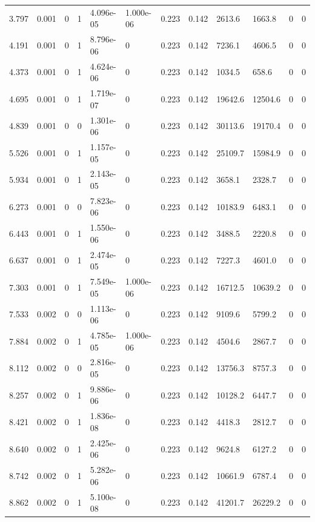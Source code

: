 \documentclass[preview]{standalone}
\begin{document}
{{\begin{tabular}{L{1.2cm}C{1.2cm} C{0.3cm}C{0.5cm} C{1.4cm}C{1.4cm} C{1.4cm}C{1.4cm} C{1.6cm}C{1.6cm} C{1.6cm}C{1.6cm}}
  3.797  &  0.001  & 0     &  1 &  4.096e-05  & 1.000e-06  &  0.223&   0.142& 2613.6 & 1663.8   &  0 & 0  \\ 
  4.191  &  0.001  & 0     &  1 &  8.796e-06  & 0  &  0.223&   0.142& 7236.1 & 4606.5   &  0 & 0  \\ 
  4.373  &  0.001  & 0     &  1 &  4.624e-06  & 0  &  0.223&   0.142& 1034.5 & 658.6   &  0 & 0  \\ 
  4.695  &  0.001  & 0     &  1 &  1.719e-07  & 0  &  0.223&   0.142& 19642.6 & 12504.6   &  0 & 0  \\ 
  4.839  &  0.001  & 0     &  0 &  1.301e-06  & 0  &  0.223&   0.142& 30113.6 & 19170.4   &  0 & 0  \\ 
  5.526  &  0.001  & 0     &  1 &  1.157e-05  & 0  &  0.223&   0.142& 25109.7 & 15984.9   &  0 & 0  \\ 
  5.934  &  0.001  & 0     &  1 &  2.143e-05  & 0  &  0.223&   0.142& 3658.1 & 2328.7   &  0 & 0  \\ 
  6.273  &  0.001  & 0     &  0 &  7.823e-06  & 0  &  0.223&   0.142& 10183.9 & 6483.1   &  0 & 0  \\ 
  6.443  &  0.001  & 0     &  1 &  1.550e-06  & 0  &  0.223&   0.142& 3488.5 & 2220.8   &  0 & 0  \\ 
  6.637  &  0.001  & 0     &  1 &  2.474e-05  & 0  &  0.223&   0.142& 7227.3 & 4601.0   &  0 & 0  \\ 
  7.303  &  0.001  & 0     &  1 &  7.549e-05  & 1.000e-06  &  0.223&   0.142& 16712.5 & 10639.2   &  0 & 0  \\ 
  7.533  &  0.002  & 0     &  0 &  1.113e-06  & 0  &  0.223&   0.142& 9109.6 & 5799.2   &  0 & 0  \\ 
  7.884  &  0.002  & 0     &  1 &  4.785e-05  & 1.000e-06  &  0.223&   0.142& 4504.6 & 2867.7   &  0 & 0  \\ 
  8.112  &  0.002  & 0     &  0 &  2.816e-05  & 0  &  0.223&   0.142& 13756.3 & 8757.3   &  0 & 0  \\ 
  8.257  &  0.002  & 0     &  1 &  9.886e-06  & 0  &  0.223&   0.142& 10128.2 & 6447.7   &  0 & 0  \\ 
  8.421  &  0.002  & 0     &  1 &  1.836e-08  & 0  &  0.223&   0.142& 4418.3 & 2812.7   &  0 & 0  \\ 
  8.640  &  0.002  & 0     &  1 &  2.425e-06  & 0  &  0.223&   0.142& 9624.8 & 6127.2   &  0 & 0  \\ 
  8.742  &  0.002  & 0     &  1 &  5.282e-06  & 0  &  0.223&   0.142& 10661.9 & 6787.4   &  0 & 0  \\ 
  8.862  &  0.002  & 0     &  1 &  5.100e-08  & 0  &  0.223&   0.142& 41201.7 & 26229.2   &  0 & 0  \\ 

\end{tabular}}}
\end{document}
